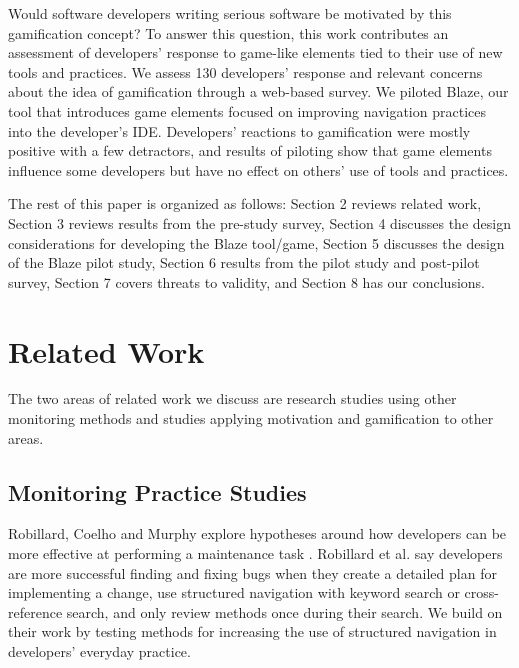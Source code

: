 \documentclass{sig-alternate}
\begin{document}
Would software developers writing serious software be motivated by this gamification concept? To answer this question, this work contributes an assessment of developers' response to game-like elements tied to their use of new tools and practices.  We assess 130 developers' response and relevant concerns about the idea of gamification through a web-based survey.  We piloted Blaze, our tool that introduces game elements focused on improving navigation practices into the developer's IDE.  Developers' reactions to gamification were mostly positive with a few detractors, and results of piloting show that game elements influence some developers but have no effect on others' use of tools and practices.

The rest of this paper is organized as follows:  Section 2 reviews related work, Section 3 reviews results from the pre-study survey, Section 4 discusses the design considerations for developing the Blaze tool/game, Section 5 discusses the design of the Blaze pilot study,  Section 6 results from the pilot study and post-pilot survey, Section 7 covers threats to validity, and Section 8 has our conclusions.

\section{Related Work}

The two areas of related work we discuss are research studies using other monitoring methods and studies applying motivation and gamification to other areas.

\subsection{Monitoring Practice Studies }

Robillard, Coelho and Murphy explore hypotheses around how developers can be more effective at performing a maintenance task \cite{wbsnipes:Robillard2004How}.  Robillard et al. say developers are more successful finding and fixing bugs when they create a detailed plan for implementing a change, use structured navigation with keyword search or cross-reference search, and only review methods once during their search.  We build on their work by testing methods for increasing the use of structured navigation in developers' everyday practice.
\end{document}
